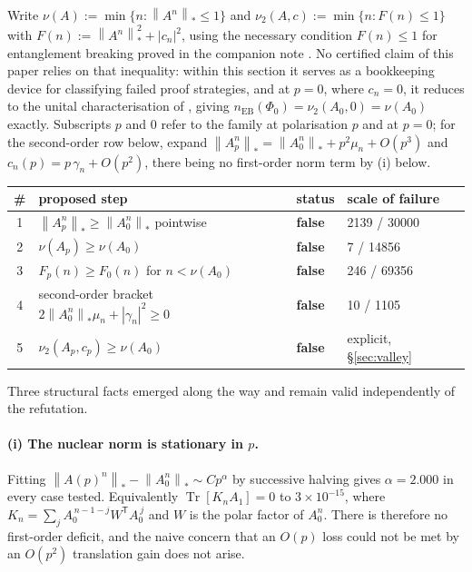 \documentclass[11pt,a4paper]{article}
\theoremstyle{definition}
\theoremstyle{remark}
\DeclareMathOperator{\Tr}{Tr}
\newcommand{\nEB}{n_{\mathrm{EB}}}
\newcommand{\nuc}[1]{\left\lVert #1 \right\rVert_{*}}
\begin{document}
Write $\nu(A) := \min\{n : \nuc{A^n} \le 1\}$ and $\nu_2(A,c) := \min\{n : F(n) \le 1\}$ with $F(n) := \nuc{A^n}^2 + |c_n|^2$, using the necessary condition $F(n) \le 1$ for entanglement breaking proved in the companion note \cite{EBnorm}. No certified claim of this paper relies on that inequality: within this section it serves as a bookkeeping device for classifying failed proof strategies, and at $p = 0$, where $c_n = 0$, it reduces to the unital characterisation of \cite{Ruskai2003}, giving $\nEB(\Phi_0) = \nu_2(A_0,0) = \nu(A_0)$ exactly. Subscripts $p$ and $0$ refer to the family at polarisation $p$ and at $p = 0$; for the second-order row below, expand $\nuc{A_p^n} = \nuc{A_0^n} + p^2\mu_n + O(p^3)$ and $c_n(p) = p\,\gamma_n + O(p^2)$, there being no first-order norm term by (i) below.

\begin{center}
\begin{tabular}{clll}
\toprule
\# & proposed step & status & scale of failure\\
\midrule
1 & $\nuc{A_p^n} \ge \nuc{A_0^n}$ pointwise & \textbf{false} & 2139 / 30000\\
2 & $\nu(A_p) \ge \nu(A_0)$ & \textbf{false} & 7 / 14856\\
3 & $F_p(n) \ge F_0(n)$ for $n < \nu(A_0)$ & \textbf{false} & 246 / 69356\\
4 & second-order bracket $2\nuc{A_0^n}\mu_n + |\gamma_n|^2 \ge 0$ & \textbf{false} & 10 / 1105\\
5 & $\nu_2(A_p,c_p) \ge \nu(A_0)$ & \textbf{false} & explicit, \S\ref{sec:valley}\\
\bottomrule
\end{tabular}
\end{center}

Three structural facts emerged along the way and remain valid independently of the refutation.

\paragraph{(i) The nuclear norm is stationary in $p$.} Fitting $\nuc{A(p)^n} - \nuc{A_0^n} \sim Cp^\alpha$ by successive halving gives $\alpha = 2.000$ in every case tested. Equivalently $\Tr[K_nA_1] = 0$ to $3\times10^{-15}$, where $K_n = \sum_j A_0^{\,n-1-j}W^{\mathsf T}A_0^{\,j}$ and $W$ is the polar factor of $A_0^n$. There is therefore no first-order deficit, and the naive concern that an $O(p)$ loss could not be met by an $O(p^2)$ translation gain does not arise.
\end{document}

